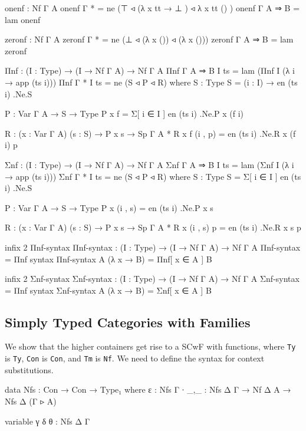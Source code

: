 \begin{code}
onenf : Nf Γ A
onenf {Γ} {*} = ne (⊤ ◃ (λ{ x tt → ⊥ }) ◃ λ{ x tt () })
onenf {Γ} {A ⇒ B} = lam onenf

zeronf : Nf Γ A
zeronf {Γ} {*} = ne (⊥ ◃ (λ x ()) ◃ (λ x ()))
zeronf {Γ} {A ⇒ B} = lam zeronf

Πnf : (I : Type) → (I → Nf Γ A) → Nf Γ A
Πnf {Γ} {A ⇒ B} I ts = lam (Πnf I (λ i → app (ts i)))
Πnf {Γ} {*} I ts = ne (S ◃ P ◃ R)
  where
  S : Type
  S = (i : I) → en (ts i) .Ne.S

  P : Var Γ A → S → Type
  P x f = Σ[ i ∈ I ] en (ts i) .Ne.P x (f i)

  R : (x : Var Γ A) (s : S) → P x s → Sp Γ A *
  R x f (i , p) = en (ts i) .Ne.R x (f i) p

Σnf : (I : Type) → (I → Nf Γ A) → Nf Γ A
Σnf {Γ} {A ⇒ B} I ts = lam (Σnf I (λ i → app (ts i)))
Σnf {Γ} {*} I ts = ne (S ◃ P ◃ R)
  where
  S : Type
  S = Σ[ i ∈ I ] en (ts i) .Ne.S

  P : Var Γ A → S → Type
  P x (i , s) = en (ts i) .Ne.P x s

  R : (x : Var Γ A) (s : S) → P x s → Sp Γ A *
  R x (i , s) p = en (ts i) .Ne.R x s p
\end{code}

\begin{code}[hide]
infix 2 Πnf-syntax
Πnf-syntax : (I : Type) → (I → Nf Γ A) → Nf Γ A
Πnf-syntax = Πnf
syntax Πnf-syntax A (λ x → B) = Πnf[ x ∈ A ] B

infix 2 Σnf-syntax
Σnf-syntax : (I : Type) → (I → Nf Γ A) → Nf Γ A
Σnf-syntax = Πnf
syntax Σnf-syntax A (λ x → B) = Σnf[ x ∈ A ] B
\end{code}


\subsection{Simply Typed Categories with Families}

We show that the higher containers get rise to a SCwF with functions, where \texttt{Ty} is \texttt{Ty}, \texttt{Con} is \texttt{Con}, and \texttt{Tm} is \texttt{Nf}. We need to define the syntax for context substitutions.

\begin{code}
data Nfs : Con → Con → Type₁ where
  ε   : Nfs Γ ∙
  _,_ : Nfs Δ Γ → Nf Δ A → Nfs Δ (Γ ▹ A)
\end{code}

\begin{code}[hide]
variable γ δ θ : Nfs Δ Γ
\end{code}

